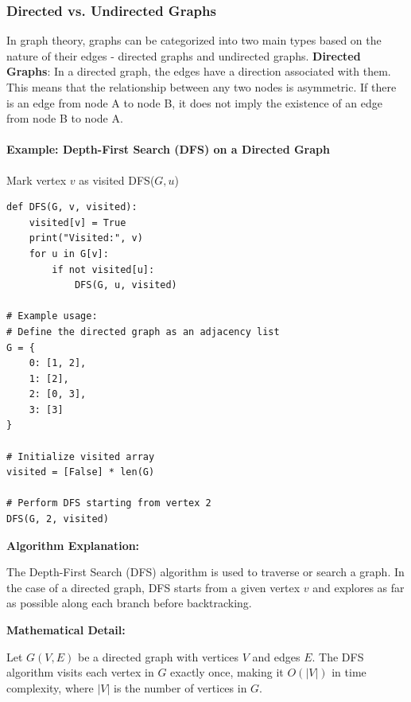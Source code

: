 \documentclass[12pt]{book} %
\begin{document}
\subsubsection{Directed vs. Undirected Graphs}
In graph theory, graphs can be categorized into two main types based on the nature of their edges - directed graphs and undirected graphs.
\FloatBarrier
\textbf{Directed Graphs}:
\FloatBarrier
In a directed graph, the edges have a direction associated with them. This means that the relationship between any two nodes is asymmetric. If there is an edge from node A to node B, it does not imply the existence of an edge from node B to node A.
\FloatBarrier
\paragraph{Example: Depth-First Search (DFS) on a Directed Graph}
\FloatBarrier
\begin{algorithm}
\caption{Depth-First Search (DFS) on a Directed Graph}
\begin{algorithmic}[1]
    \State Mark vertex $v$ as visited
            \State \textsc{DFS}($G, u$)
        \EndIf
    \EndFor
\EndFunction
\end{algorithmic}
\end{algorithm}
\FloatBarrier
\begin{verbatim}
def DFS(G, v, visited):
    visited[v] = True
    print("Visited:", v)
    for u in G[v]:
        if not visited[u]:
            DFS(G, u, visited)

# Example usage:
# Define the directed graph as an adjacency list
G = {
    0: [1, 2],
    1: [2],
    2: [0, 3],
    3: [3]
}

# Initialize visited array
visited = [False] * len(G)

# Perform DFS starting from vertex 2
DFS(G, 2, visited)
\end{verbatim}
\FloatBarrier

\textbf{Algorithm Explanation:}

The Depth-First Search (DFS) algorithm is used to traverse or search a graph. In the case of a directed graph, DFS starts from a given vertex $v$ and explores as far as possible along each branch before backtracking.

\textbf{Mathematical Detail:}

Let $G(V, E)$ be a directed graph with vertices $V$ and edges $E$. The DFS algorithm visits each vertex in $G$ exactly once, making it $O(|V|)$ in time complexity, where $|V|$ is the number of vertices in $G$. 
\end{document}
